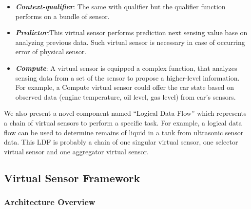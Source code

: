\begin{itemize}
    \item \textbf{\textit{Context-qualifier}}: The same with qualifier but the qualifier function performs on a bundle of sensor.
    \item \textbf{\textit{Predictor}}:This virtual sensor performs prediction next sensing value base on analyzing previous data. Such virtual sensor is necessary in case of occurring error of physical sensor.
    \item \textbf{\textit{Compute}}: A virtual sensor is equipped a complex function, that analyzes sensing data from a set of the sensor to propose a higher-level information. For example, a Compute virtual sensor could offer the car state based on observed data (engine temperature, oil level, gas level) from car’s sensors.
\end{itemize}
We also present a novel component named “Logical Data-Flow” which represents a chain of virtual sensors to perform a specific task.  For example, a logical data flow can be used to determine remains of liquid in a tank from ultrasonic sensor data. This LDF is probably a chain of one singular virtual sensor, one selector virtual sensor and one aggregator virtual sensor.

\subsection{Virtual Sensor Framework}
\subsubsection{Architecture Overview}

